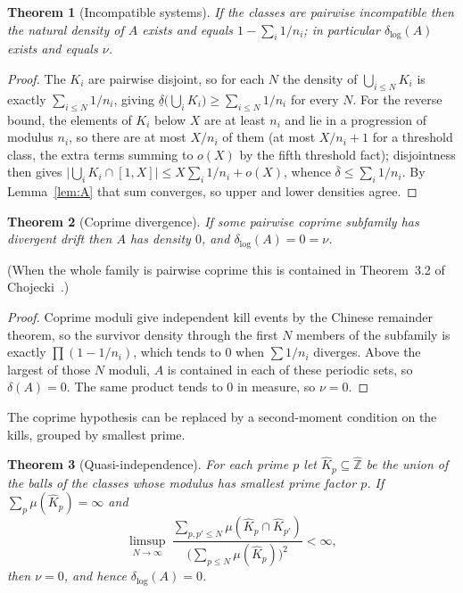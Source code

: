 \documentclass[11pt]{article}
\theoremstyle{plain}
\newtheorem{theorem}{Theorem}[section]
\theoremstyle{definition}
\newcommand{\Zhat}{\widehat{\mathbb{Z}}}
\newcommand{\dlog}{\delta_{\log}}
\newcommand{\Kh}{\widehat{K}}
\begin{document}
\begin{theorem}[Incompatible systems]\label{thm:H}
If the classes are pairwise incompatible then the natural
density of $A$ exists and equals $1-\sum_i 1/n_i$; in
particular $\dlog(A)$ exists and equals $\nu$.
\end{theorem}

\begin{proof}
The $K_i$ are pairwise disjoint, so for each $N$ the density of
$\bigcup_{i\le N}K_i$ is exactly $\sum_{i\le N}1/n_i$, giving
$\underline{\delta}\bigl(\bigcup_i K_i\bigr)\ge\sum_{i\le N}1/n_i$
for every $N$.  For the reverse bound, the elements of $K_i$
below $X$ are at least $n_i$ and lie in a progression of modulus
$n_i$, so there are at most $X/n_i$ of them (at most $X/n_i+1$
for a threshold class, the extra terms summing to $o(X)$ by the
fifth threshold fact); disjointness then
gives $\bigl|\bigcup_i K_i\cap[1,X]\bigr|\le X\sum_i 1/n_i+o(X)$,
whence $\overline{\delta}\le\sum_i 1/n_i$.  By
Lemma~\ref{lem:A} that sum converges, so upper and lower
densities agree.
\end{proof}

\begin{theorem}[Coprime divergence]\label{thm:D}
If some pairwise coprime subfamily has divergent drift then
$A$ has density $0$, and $\dlog(A)=0=\nu$.
\end{theorem}

\noindent(When the whole family is pairwise coprime this is
contained in Theorem~3.2 of Chojecki~\cite{Choj26}.)

\begin{proof}
Coprime moduli give independent kill events by the Chinese
remainder theorem, so the survivor density through the first
$N$ members of the subfamily is exactly $\prod(1-1/n_i)$, which
tends to $0$ when $\sum 1/n_i$ diverges.  Above the largest of
those $N$ moduli, $A$ is contained in each of these periodic
sets, so $\delta(A)=0$.  The same product tends to
$0$ in measure, so $\nu=0$.
\end{proof}

The coprime hypothesis can be replaced by a second-moment
condition on the kills, grouped by smallest prime.

\begin{theorem}[Quasi-independence]\label{thm:quasi}
For each prime $p$ let $\Kh_p\subseteq\Zhat$ be the union of the
balls of the classes whose modulus has smallest prime factor
$p$.  If $\sum_p\mu(\Kh_p)=\infty$ and
\[
\limsup_{N\to\infty}\
\frac{\sum_{p,p'\le N}\mu(\Kh_p\cap \Kh_{p'})}
     {\bigl(\sum_{p\le N}\mu(\Kh_p)\bigr)^2}<\infty,
\]
then $\nu=0$, and hence $\dlog(A)=0$.
\end{theorem}
\end{document}
